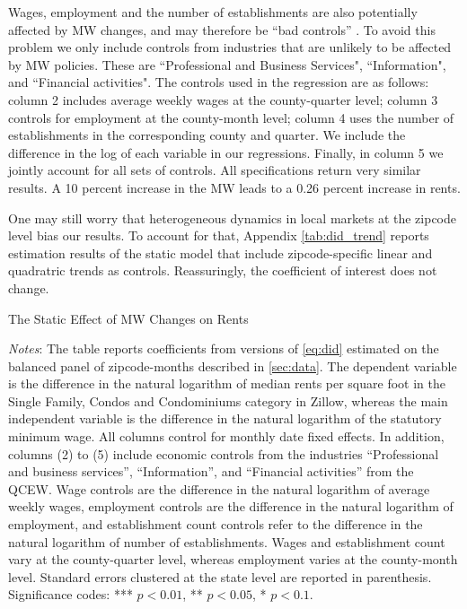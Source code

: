 Wages, employment and the number of establishments are also potentially affected by MW changes,
and may therefore be ``bad controls'' 
\parencite{AngristPischke2009}. To avoid this problem we only include controls from industries 
that are unlikely to be affected by MW policies. These are ``Professional and Business Services", 
``Information", and ``Financial activities". The controls used in the regression are as follows:
column 2 includes average weekly wages at the county-quarter level; column 3 controls for 
employment at the county-month level; column 4 uses the number of establishments in the 
corresponding county and quarter. We include the difference in the log of each variable in our
regressions. Finally, in column 5 we jointly account for all sets of controls. All specifications 
return very similar results. A 10 percent increase in the MW leads to a 0.26 percent increase 
in rents. 

One may still worry that heterogeneous dynamics in local markets at the zipcode level bias our 
results. To account for that, Appendix \autoref{tab:did_trend} reports estimation results of the 
static model that include zipcode-specific linear and quadratric trends as controls. 
Reassuringly, the coefficient of interest does not change.

\begin{table}[h!]
    \caption{The Static Effect of MW Changes on Rents}
    \label{tab:static_model}
    \centering
    
    \begin{minipage}{0.9\textwidth} \footnotesize
		\vspace{3mm} 
		\textit{Notes}: The table reports coefficients from versions of \autoref{eq:did} 
		estimated on the balanced panel of zipcode-months described in \autoref{sec:data}. 
		The dependent variable is the difference in the natural logarithm of median	rents 
		per square foot in the Single Family, Condos and Condominiums category in Zillow, 
		whereas the main independent variable is the difference in the natural logarithm of 
		the statutory minimum wage. All columns control for monthly date fixed effects. In 
		addition, columns (2) to (5) include economic controls from the industries 
		``Professional and business services'', ``Information'', and ``Financial activities'' 
		from the QCEW. Wage controls are the difference in the natural logarithm of average 
		weekly wages, employment controls are the difference in the natural logarithm of 
		employment, and establishment count controls refer to the difference in the natural 
		logarithm of number of establishments. Wages and establishment count vary at the 
		county-quarter level, whereas employment varies at the county-month level. 
		Standard errors clustered at the state level are reported in parenthesis. Significance 
		codes: *** $p < 0.01$, ** $p < 0.05$, * $p < 0.1$.
	\end{minipage}
\end{table}

